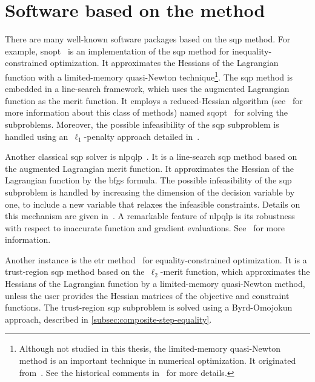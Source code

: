 \section{Software based on the  method}
\label{sec:existing-sqp-software}

There are many well-known software packages based on the \gls{sqp} method.
For example, \gls{snopt}~\cite{Gill_Murray_Saunders_2002,Gill_Murray_Saunders_2005} is an implementation of the \gls{sqp} method for inequality-constrained optimization.
It approximates the Hessians of the Lagrangian function with a limited-memory quasi-Newton technique\footnote{Although not studied in this thesis, the limited-memory quasi-Newton method is an important technique in numerical optimization. It originated from~\cite{Perry_1977,Shanno_1978}. See the historical comments in~\cite[\S~1, \P~3]{Liu_Nocedal_1989} for more details.}.
The \gls{sqp} method is embedded in a line-search framework, which uses the augmented Lagrangian function as the merit function.
It employs a reduced-Hessian algorithm (see~\cite{Byrd_Nocedal_1991} for more information about this class of methods) named \gls{sqopt}~\cite{Gill_Murray_Saunders_2008} for solving the subproblems.
Moreover, the possible infeasibility of the \gls{sqp} subproblem is handled using an~$\ell_1$-penalty approach detailed in~\cite[\S~1.2]{Gill_Murray_Saunders_2005}.

Another classical \gls{sqp} solver is \gls{nlpqlp}~\cite{Schittkowski_2015}.
It is a line-search \gls{sqp} method based on the augmented Lagrangian merit function.
It approximates the Hessian of the Lagrangian function by the \gls{bfgs} formula.
The possible infeasibility of the \gls{sqp} subproblem is handled by increasing the dimension of the decision variable by one, to include a new variable that relaxes the infeasible constraints.
Details on this mechanism are given in~\cite[Eq.~(9)]{Schittkowski_1986}.
A remarkable feature of \gls{nlpqlp} is its robustness with respect to inaccurate function and gradient evaluations.
See~\cite{Schittkowski_2015} for more information.

Another instance is the \gls{etr} method~\cite{Lalee_Nocedal_Plantenga_1998} for equality-constrained optimization.
It is a trust-region \gls{sqp} method based on the~$\ell_2$-merit function, which approximates the Hessians of the Lagrangian function by a limited-memory quasi-Newton method, unless the user provides the Hessian matrices of the objective and constraint functions.
The trust-region \gls{sqp} subproblem is solved using a Byrd-Omojokun approach, described in \cref{subsec:composite-step-equality}.


